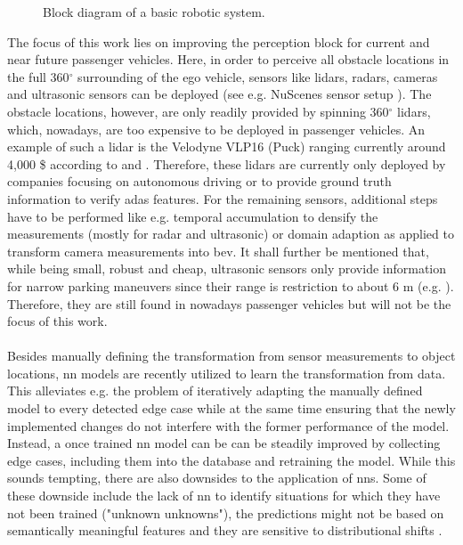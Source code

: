 %
\begin{figure}[H]
	\begin{center}
		\caption{\label{fig:basic_robot_system}Block diagram of a basic robotic system.}
	\end{center}
\end{figure} 
%
The focus of this work lies on improving the perception block for current and near future passenger vehicles. Here, in order to perceive all obstacle locations in the full 360$^{\circ}$ surrounding of the ego vehicle, sensors like lidars, radars, cameras and ultrasonic sensors can be deployed (see e.g. NuScenes sensor setup \cite{caesar2020nuscenes}). The obstacle locations, however, are only readily provided by spinning 360$^{\circ}$ lidars, which, nowadays, are too expensive to be deployed in passenger vehicles. An example of such a lidar is the Velodyne VLP16 (Puck) ranging currently around 4,000 \$ according to \cite{cnet2018} and \cite{velodyne2018}. Therefore, these lidars are currently only deployed by companies focusing on autonomous driving or to provide ground truth information to verify \gls{adas} features. For the remaining sensors, additional steps have to be performed like e.g. temporal accumulation to densify the measurements (mostly for radar and ultrasonic) or domain adaption as applied to transform camera measurements into \gls{bev}. It shall further be mentioned that, while being small, robust and cheap, ultrasonic sensors only provide information for narrow parking maneuvers since their range is restriction to about 6 m (e.g. \cite{boschultrasonic2022}). Therefore, they are still found in nowadays passenger vehicles but will not be the focus of this work.
\\\\
Besides manually defining the transformation from sensor measurements to object locations, \gls{nn} models are recently utilized to learn the transformation from data. This alleviates e.g. the problem of iteratively adapting the manually defined model to every detected edge case while at the same time ensuring that the newly implemented changes do not interfere with the former performance of the model. Instead, a once trained \gls{nn} model can be can be steadily improved by collecting edge cases, including them into the database and retraining the model. While this sounds tempting, there are also downsides to the application of \gls{nn}s. Some of these downside include the lack of \gls{nn} to identify situations for which they have not been trained ("unknown unknowns"), the predictions might not be based on semantically meaningful features and they are sensitive to distributional shifts \cite{safetyfirst2019}.
